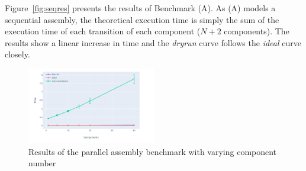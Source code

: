Figure~\ref{fig:seqres} presents the results of Benchmark (A). As (A)
models a sequential assembly, the theoretical execution time is simply
the sum of the execution time of each transition of each component
($N+2$ components). The results show a linear increase in time and the
\emph{dryrun} curve follows the \emph{ideal} curve closely.

\begin{figure}[h]
  \begin{center} 
    \includegraphics[width=0.5\textwidth]{./images/evaluations_par_component.pdf}
    \caption{Results of the parallel assembly benchmark with varying component number}
    \label{fig:parcompres}
  \end{center}
\end{figure}


